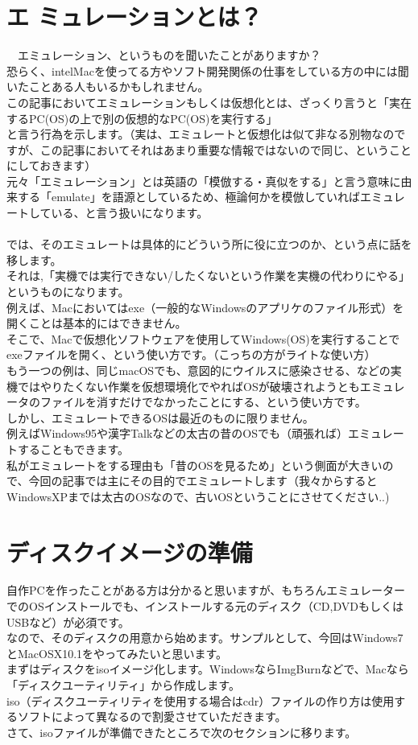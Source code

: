 \documentclass[b5paper,9pt,platex,dvipdfmx]{jsarticle}
\begin{document}
\begin{multicols*}{3}
\section{エ
ミュレーションとは？}
　エミュレーション、というものを聞いたことがありますか？\\
恐らく、intelMacを使ってる方やソフト開発関係の仕事をしている方の中には聞いたことある人もいるかもしれません。\\
この記事においてエミュレーションもしくは仮想化とは、ざっくり言うと「実在するPC(OS)の上で別の仮想的なPC(OS)を実行する」\\
と言う行為を示します。（実は、エミュレートと仮想化は似て非なる別物なのですが、この記事においてそれはあまり重要な情報ではないので同じ、ということにしておきます）\\
元々「エミュレーション」とは英語の「模倣する・真似をする」と言う意味に由来する「emulate」を語源としているため、極論何かを模倣していればエミュレートしている、と言う扱いになります。\\
\\
では、そのエミュレートは具体的にどういう所に役に立つのか、という点に話を移します。\\
それは,「実機では実行できない/したくないという作業を実機の代わりにやる」というものになります。\\
例えば、Macにおいてはexe（一般的なWindowsのアプリケのファイル形式）を開くことは基本的にはできません。\\
そこで、Macで仮想化ソフトウェアを使用してWindows(OS)を実行することでexeファイルを開く、という使い方です。（こっちの方がライトな使い方）\\
もう一つの例は、同じmacOSでも、意図的にウイルスに感染させる、などの実機ではやりたくない作業を仮想環境化でやればOSが破壊されようともエミュレータのファイルを消すだけでなかったことにする、という使い方です。\\
しかし、エミュレートできるOSは最近のものに限りません。\\
例えばWindows95や漢字Talkなどの太古の昔のOSでも（頑張れば）エミュレートすることもできます。\\
私がエミュレートをする理由も「昔のOSを見るため」という側面が大きいので、今回の記事では主にその目的でエミュレートします（我々からするとWindowsXPまでは太古のOSなので、古いOSということにさせてください..)\\
\section{ディスクイメージの準備}
自作PCを作ったことがある方は分かると思いますが、もちろんエミュレーターでのOSインストールでも、インストールする元のディスク（CD,DVDもしくはUSBなど）が必須です。\\
なので、そのディスクの用意から始めます。サンプルとして、今回はWindows7とMacOSX10.1をやってみたいと思います。\\
まずはディスクをisoイメージ化します。WindowsならImgBurnなどで、Macなら「ディスクユーティリティ」から作成します。\\
iso（ディスクユーティリティを使用する場合はcdr）ファイルの作り方は使用するソフトによって異なるので割愛させていただきます。\\
さて、isoファイルが準備できたところで次のセクションに移ります。\\

\end{multicols*}
\end{document}
